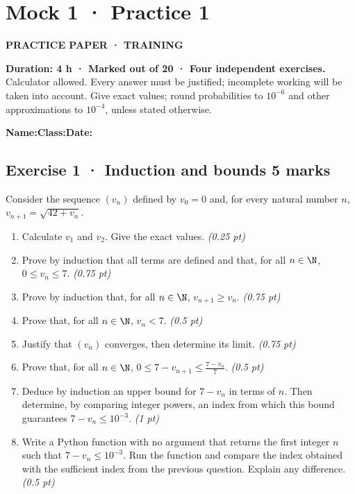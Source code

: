 \clearpage{}\label{sujet:5-1}

\section*{Mock 1 · Practice 1}

{\sffamily\bfseries\color{teal}PRACTICE PAPER · TRAINING\par}

\textbf{Duration: 4 h · Marked out of 20 · Four independent exercises.}\\Calculator allowed. Every answer must be justified; incomplete working will be taken into account. Give exact values; round probabilities to $10^{-6}$ and other approximations to $10^{-4}$, unless stated otherwise.

\smallskip\textbf{Name:}\enspace\dotfill\quad\textbf{Class:}\enspace\dotfill\quad\textbf{Date:}\enspace\dotfill

\subsection*{Exercise 1 · Induction and bounds \hfill 5 marks}Consider the sequence $(v_n)$ defined by $v_0=0$ and, for every natural number $n$, $v_{n+1}=\sqrt{42+v_n}$.

\begin{enumerate}

\item Calculate $v_1$ and $v_2$. Give the exact values. \hfill\textit{(0.25 pt)}

\item Prove by induction that all terms are defined and that, for all $n\in\N$, $0\le v_n\le7$. \hfill\textit{(0.75 pt)}

\item Prove by induction that, for all $n\in\N$, $v_{n+1}\ge v_n$. \hfill\textit{(0.75 pt)}

\item Prove that, for all $n\in\N$, $v_n<7$. \hfill\textit{(0.5 pt)}

\item Justify that $(v_n)$ converges, then determine its limit. \hfill\textit{(0.75 pt)}

\item Prove that, for all $n\in\N$, $0\le 7-v_{n+1}\le\frac{7-v_n}{7}$. \hfill\textit{(0.5 pt)}

\item Deduce by induction an upper bound for $7-v_n$ in terms of $n$. Then determine, by comparing integer powers, an index from which this bound guarantees $7-v_n\le10^{-3}$. \hfill\textit{(1 pt)}

\item Write a Python function with no argument that returns the first integer $n$ such that $7-v_n\le10^{-3}$. Run the function and compare the index obtained with the sufficient index from the previous question. Explain any difference. \hfill\textit{(0.5 pt)}

\end{enumerate}

